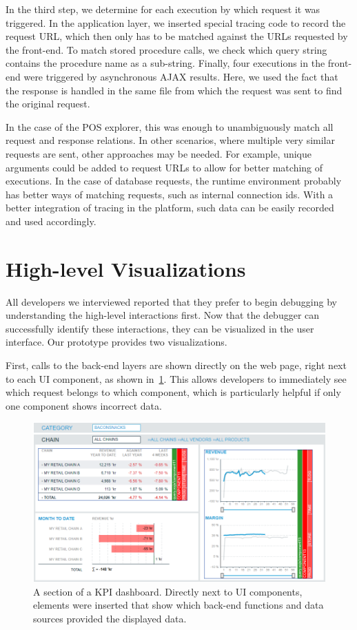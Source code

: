 In the third step, we determine for each execution by which request it was triggered.
In the application layer, we inserted special tracing code to record the request URL, which then only has to be matched against the URLs requested by the front-end.
To match stored procedure calls, we check which query string contains the procedure name as a sub-string.
Finally, four executions in the front-end were triggered by asynchronous AJAX results.
Here, we used the fact that the response is handled in the same file from which the request was sent to find the original request.

In the case of the POS explorer, this was enough to unambiguously match all request and response relations.
In other scenarios, where multiple very similar requests are sent, other approaches may be needed.
For example, unique arguments could be added to request URLs to allow for better matching of executions.
In the case of database requests, the runtime environment probably has better ways of matching requests, such as internal connection ids.
With a better integration of tracing in the platform, such data can be easily recorded and used accordingly.

\section{High-level Visualizations}


All developers we interviewed reported that they prefer to begin debugging by understanding the high-level interactions first.
Now that the debugger can successfully identify these interactions, they can be visualized in the user interface.
Our prototype provides two visualizations.

First, calls to the back-end layers are shown directly on the web page, right next to each UI component, as shown in~\cref{fig:pos}.
This allows developers to immediately see which request belongs to which component, which is particularly helpful if only one component shows incorrect data.

\begin{figure}
	\centering
		\includegraphics[width=1.00\linewidth]{img/pos.png}
	\caption{A section of a KPI dashboard. Directly next to UI components, elements were inserted that show which back-end functions and data sources provided the displayed data.}
	\label{fig:pos}
\end{figure}

